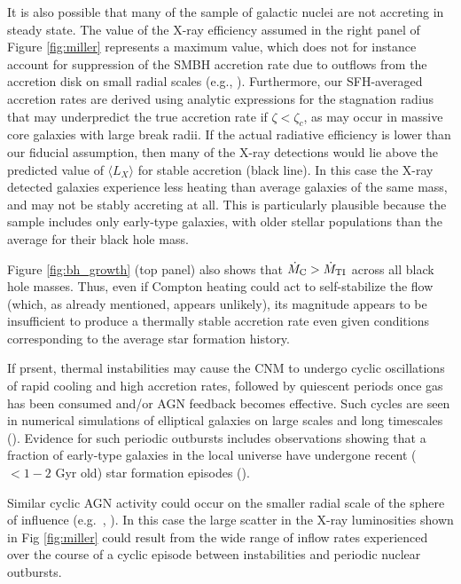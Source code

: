 \documentclass[usenatbib,fleqn]{mn2e}
\begin{document}
It is also possible that many of the \citet{Miller+15} sample of
galactic nuclei are not accreting in steady state.  The value of the
X-ray efficiency assumed in the right panel of Figure \ref{fig:miller}
represents a maximum value, which does not for instance account for suppression
of the SMBH accretion rate due to outflows from the accretion disk on
small radial scales (e.g., \citealt{Blandford&Begelman99}).  Furthermore, our SFH-averaged accretion rates are derived using analytic expressions for the stagnation radius that may underpredict the true accretion rate if $\zeta < \zeta_c$, as may occur in massive core galaxies with large break radii.  If the actual radiative efficiency is lower than our fiducial assumption,
then many of the X-ray detections would lie above the predicted value
of $\langle L_X \rangle$ for stable accretion (black line).  In this
case the X-ray detected galaxies experience less heating than
average galaxies of the same mass, and may not be stably accreting at
all.  This is particularly plausible because the \citet{Miller+15} sample includes only early-type galaxies, with older stellar
populations than the average for their black hole mass.

Figure \ref{fig:bh_growth} (top panel) also shows that $\dot{M}_{\rm
  C} > \dot{M}_{\rm TI}$ across all black hole masses.  Thus, even if
Compton heating could act to self-stabilize the flow (which, as already
mentioned, appears unlikely), its magnitude appears to be insufficient to
produce a thermally stable accretion rate even given conditions
corresponding to the average star formation history.  

If prsent, thermal
instabilities may cause the CNM to undergo cyclic
oscillations of rapid cooling and high accretion rates, followed by
quiescent periods once gas has been consumed and/or AGN feedback
becomes effective.  Such cycles are seen in numerical simulations of
elliptical galaxies on large scales and long timescales
(\citealt{Ciotti+10}).  Evidence for such periodic outbursts includes observations
showing that a fraction of early-type galaxies in the local universe
have undergone recent ($< 1-2$ Gyr old) star formation episodes
(\citealt{Donas+07}).

Similar cyclic AGN activity could occur on the smaller radial scale of
the sphere of influence (e.g.~\citealt{Yuan&Li11},
\citealt{Cuadra+15}).  In this case the large scatter in the X-ray
luminosities shown in Fig \ref{fig:miller} could result from the wide
range of inflow rates experienced over the course of a cyclic episode
between instabilities and periodic nuclear outbursts. 
\end{document}
